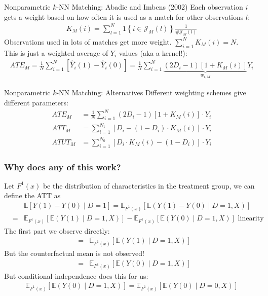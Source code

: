 \documentclass[aspectratio=169,11pt]{beamer}
\begin{document}
\begin{frame}{Nonparametric $k$-NN Matching: Abadie and Imbens (2002)}
Each observation $i$ gets a weight based on how often it is used as a match for other observations $l$:
\begin{align*}
K_{M}(i)=\sum_{l=1}^{N} 1\left\{i \in \mathcal{J}_{M}(l)\right\} \frac{1}{\# \mathcal{J}_{M}(l)}
\end{align*}
 Observations used in lots of matches get more weight. $\sum_{i=1}^N K_{M}(i) = N$.\\
 
This is just a weighted average of $Y_i$ values (aka a \alert{kernel}!):
\begin{align*}
ATE_M=\frac{1}{N} \sum_{i=1}^{N}\left[ \widehat{Y}_{i}(1)-\widehat{Y}_{i}(0)\right]=\frac{1}{N} \sum_{i=1}^{N} \underbrace{\left(2 D_{i}-1\right)\left[1+K_{M}(i)\right]}_{w_{i,M}} Y_{i}
\end{align*}
\end{frame}


\begin{frame}{Nonparametric $k$-NN Matching: Alternatives}
Different weighting schemes give different parameters:
\begin{align*}
ATE_M&=\frac{1}{N} \sum_{i=1}^{N} \left(2 D_{i}-1\right)\left[1+K_{M}(i)\right] \cdot Y_{i} \\
ATT_M&=\sum_{i=1}^{N_1} \left[D_{i}-(1-D_i) \cdot K_{M}(i)\right] \cdot  Y_{i}\\
ATUT_M&=\sum_{i=1}^{N_0} \left[D_{i}\cdot K_{M}(i) -(1-D_i) \right] \cdot Y_{i}
\end{align*}
\end{frame}


\begin{frame}
\frametitle{Why does any of this work?}
\small
Let  $F^{1}(x)$ be the distribution of characteristics in the treatment group, we can define the ATT as 
\begin{eqnarray*}
&&\mathbb{E}[Y(1) - Y(0) \mid D =1] =\mathbb{E}_{F^1(x)} \left[\mathbb{E}(Y(1) -Y(0) \mid D=1,X) \right] \\
&=&  \mathbb{E}_{F^1(x)} [\mathbb{E}(Y(1) \mid D=1,X)] -  \mathbb{E}_{F^1(x)} [\mathbb{E}(Y(0) \mid D=1,X)] \mbox{ linearity } 
\end{eqnarray*}
The first part we observe directly:
\begin{eqnarray*}
&=&  \mathbb{E}_{F^1(x)} [\mathbb{E}(Y(1) \mid D=1,X)] 
\end{eqnarray*}
But the counterfactual mean is not observed!
\begin{eqnarray*}
&=&  \mathbb{E}_{F^1(x)} [\mathbb{E}(Y(0) \mid D=1,X)] 
\end{eqnarray*}
But conditional independence does this for us:
\begin{eqnarray*}
 \mathbb{E}_{F^1(x)} [\mathbb{E}(Y(0) \mid D=1,X)]  =  \mathbb{E}_{F^1(x)} [\mathbb{E}(Y(0) \mid D=0,X)] 
\end{eqnarray*}
\end{frame}
\end{document}
